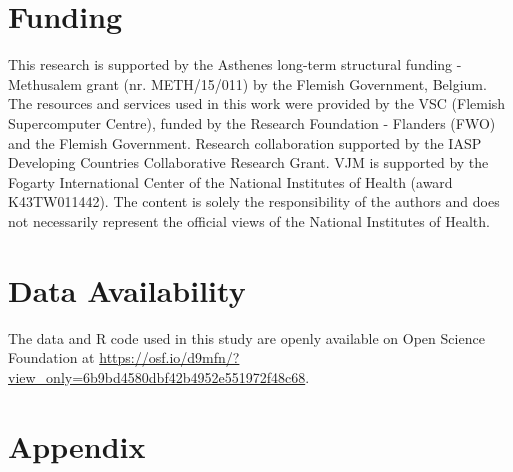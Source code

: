 \documentclass{article}
\begin{document}
\section{Funding}

This research is supported by the Asthenes long-term structural funding - Methusalem grant (nr. METH/15/011) by the Flemish Government, Belgium. The resources and services used in this work were provided by the VSC (Flemish Supercomputer Centre), funded by the Research Foundation - Flanders (FWO) and the Flemish Government. Research collaboration supported by the IASP Developing Countries Collaborative Research Grant. VJM is supported by the Fogarty International Center of the National Institutes of Health (award K43TW011442). The content is solely the responsibility of the authors and does not necessarily represent the official views of the National Institutes of Health.

\section{Data Availability}

The data and R code used in this study are openly available on Open Science Foundation at \href{https://osf.io/d9mfn/?view\_only=6b9bd4580dbf42b4952e551972f48c68}{https://osf.io/d9mfn/?view\_only=6b9bd4580dbf42b4952e551972f48c68}.

\section{Appendix} 
\end{document}
